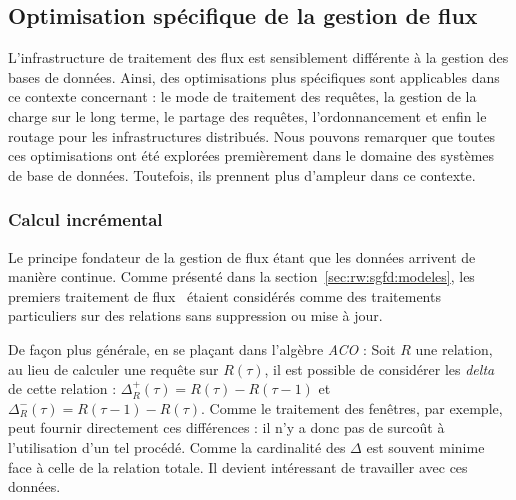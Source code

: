 %

\subsection{Optimisation spécifique de la gestion de flux}\label{sec:rw:sgfd:optimisation:flux}
L'infrastructure de traitement des flux est sensiblement différente à la gestion des bases de données. Ainsi, des optimisations plus spécifiques sont applicables dans ce contexte concernant : le mode de traitement des requêtes, la gestion de la charge sur le long terme, le partage des requêtes, l'ordonnancement et enfin le routage pour les infrastructures distribués. Nous pouvons remarquer que toutes ces optimisations ont été explorées premièrement dans le domaine des systèmes de base de données. Toutefois, ils prennent plus d'ampleur dans ce contexte.

\subsubsection{Calcul incrémental}
Le principe fondateur de la gestion de flux étant que les données arrivent de manière continue. Comme présenté dans la section~\ref{sec:rw:sgfd:modeles}, les premiers traitement de flux~\cite{Terry:tapestry} étaient considérés comme des traitements particuliers sur des relations sans suppression ou mise à jour.

De façon plus générale, en se plaçant dans l'algèbre \textit{ACO} : Soit $R$ une relation, au lieu de calculer une requête sur $R(\tau)$, il est possible de considérer les \textit{delta} de cette relation : $\Delta_R^+(\tau) = R(\tau)-R(\tau-1)$ et $\Delta_R^-(\tau) = R(\tau-1)-R(\tau)$. Comme le traitement des fenêtres, par exemple, peut fournir directement ces différences : il n'y a donc pas de surcoût à l'utilisation d'un tel procédé. Comme la cardinalité des $\Delta$ est souvent minime face à celle de la relation totale. Il devient intéressant de travailler avec ces données.


